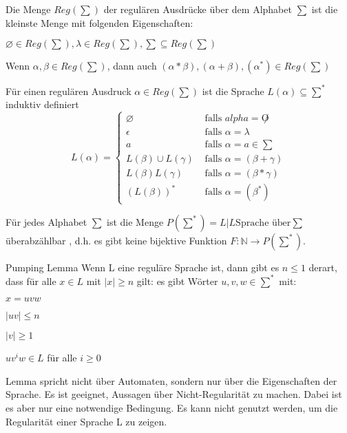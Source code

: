 \documentclass[avery5371, frame]{flashcards}
\begin{document}
\begin{flashcard}[Definition]{ Die Menge $Reg(\sum)$ der regulären Ausdrücke über dem Alphabet $\sum$}
    ist die kleinste Menge mit folgenden Eigenschaften:
    \begin{itemize*}
        \item $\varnothing \in Reg(\sum), \lambda \in Reg(\sum), \sum \subseteq Reg(\sum)$
        \item Wenn $\alpha, \beta \in Reg(\sum)$, dann auch $(\alpha * \beta), (\alpha + \beta), (\alpha^*)\in Reg(\sum)$
    \end{itemize*}
\end{flashcard}

\begin{flashcard}[Definition]{ Für einen regulären Ausdruck $\alpha \in Reg(\sum)$ ist die Sprache $L(\alpha)\subseteq \sum^*$}
    induktiv definiert
    $$L(\alpha)=\begin{cases}
            \varnothing            & \text{ falls } alpha=\not O             \\
            {\epsilon}             & \text{ falls } \alpha = \lambda         \\
            {a}                    & \text{ falls } \alpha=a\in \sum         \\
            L(\beta)\cup L(\gamma) & \text{ falls } \alpha =(\beta + \gamma) \\
            L(\beta)L(\gamma)      & \text{ falls } \alpha=(\beta*\gamma)    \\
            (L(\beta))^*           & \text{ falls } \alpha=(\beta^*)
        \end{cases}$$
\end{flashcard}

\begin{flashcard}[Satz]{ Für jedes Alphabet $\sum$ ist die Menge $P(\sum^*)={L|L \text{Sprache über} \sum}$ überabzählbar}
    , d.h. es gibt keine bijektive Funktion $F:\mathbb{N} \rightarrow P(\sum^*)$.
\end{flashcard}

\begin{flashcard}[]{Pumping Lemma}
    \small
    Wenn L eine reguläre Sprache ist, dann gibt es $n\leq 1$ derart, dass für alle $x\in L$ mit $|x|\geq n$ gilt:
    es gibt Wörter $u,v,w \in \sum^*$ mit:
    \begin{enumerate*}
        \item $x=uvw$
        \item $|uv|\leq n$
        \item $|v|\geq 1$
        \item $uv^i w\in L$ für alle $i\geq 0$
    \end{enumerate*}
    \scriptsize Lemma spricht nicht über Automaten, sondern nur über die Eigenschaften der Sprache. Es ist geeignet, Aussagen über Nicht-Regularität zu machen. Dabei ist es aber nur eine notwendige Bedingung. Es kann nicht genutzt werden, um die Regularität einer Sprache L zu zeigen.
\end{flashcard}
\end{document}
